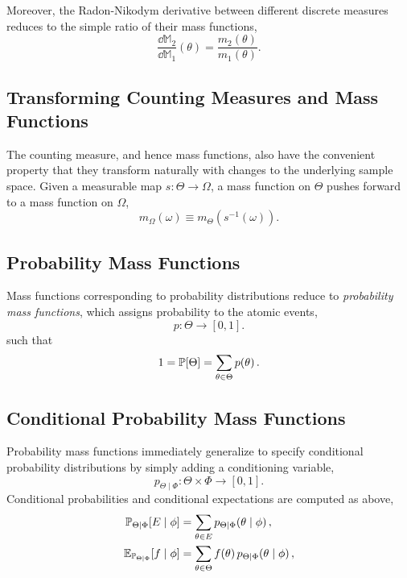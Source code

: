 Moreover, the Radon-Nikodym derivative between different discrete 
measures reduces to the simple ratio of their mass functions,
%
\begin{equation*}
\frac{ \dd \mathbb{M}_{2} }{ \dd \mathbb{M}_{1} } \! \left( \theta \right)
=
\frac{ m_{2} \! \left( \theta \right) }{ m_{1} \! \left( \theta \right) }.
\end{equation*}

\subsection{Transforming Counting Measures and Mass Functions}

The counting measure, and hence mass functions, also have the
convenient property that they transform naturally with changes to
the underlying sample space.  Given a measurable map 
$s : \Theta \rightarrow \Omega$, a mass function on $\Theta$
pushes forward to a mass function on $\Omega$,
%
\begin{equation*}
m_{\Omega} \! \left( \omega \right) 
\equiv 
m_{\Theta} \! \left( s^{-1} \! \left( \omega \right) \right).
\end{equation*}

\subsection{Probability Mass Functions}

Mass functions corresponding to probability distributions reduce
to \emph{probability mass functions}, which assigns probability to the
atomic events,
%
\begin{equation*}
p : \Theta \rightarrow \left[0, 1\right].
\end{equation*}
%
such that
%
\begin{equation*}
1 = \mathbb{P} \! \left[ \Theta \right] = \sum_{\theta \in \Theta} p \! \left( \theta \right).
\end{equation*}

\subsection{Conditional Probability Mass Functions}

Probability mass functions immediately generalize to specify conditional 
probability distributions by simply adding a conditioning variable,
%
\begin{equation*}
p_{\Theta \mid \Phi} : \Theta \times \Phi \rightarrow \left[0, 1\right].
\end{equation*}
%
Conditional probabilities and conditional expectations are computed
as above,
%
\begin{align*}
\mathbb{P}_{\Theta \mid \Phi}  \! \left[ E \mid \phi \right]
&=
\sum_{\theta \in E} p_{\Theta \mid \Phi}  \! \left( \theta \mid \phi \right),
\\
\mathbb{E}_{\mathbb{P}_{\Theta \mid \Phi} } \! \left[ f \mid \phi \right]
&=
\sum_{\theta \in \Theta} f \! \left( \theta \right) 
p_{\Theta \mid \Phi}  \! \left( \theta \mid \phi \right),
\end{align*}


